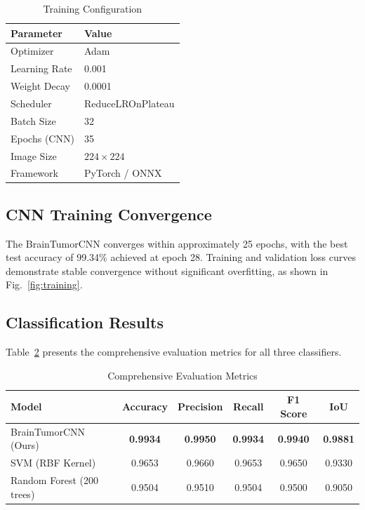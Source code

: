 \documentclass[conference]{IEEEtran}
\begin{document}
\begin{table}[h]
\centering
\caption{Training Configuration}
\label{tab:training}
\begin{tabular}{ll}
\toprule
\textbf{Parameter} & \textbf{Value} \\
\midrule
Optimizer & Adam \\
Learning Rate & 0.001 \\
Weight Decay & 0.0001 \\
Scheduler & ReduceLROnPlateau \\
Batch Size & 32 \\
Epochs (CNN) & 35 \\
Image Size & $224 \times 224$ \\
Framework & PyTorch / ONNX \\
\bottomrule
\end{tabular}
\end{table}

\subsection{CNN Training Convergence}
The BrainTumorCNN converges within approximately 25 epochs, with the best test accuracy of 99.34\% achieved at epoch 28. Training and validation loss curves demonstrate stable convergence without significant overfitting, as shown in Fig.~\ref{fig:training}.

\subsection{Classification Results}
Table~\ref{tab:results} presents the comprehensive evaluation metrics for all three classifiers.

\begin{table}[h]
\centering
\caption{Comprehensive Evaluation Metrics}
\label{tab:results}
\begin{tabular}{lccccc}
\toprule
\textbf{Model} & \textbf{Accuracy} & \textbf{Precision} & \textbf{Recall} & \textbf{F1 Score} & \textbf{IoU} \\
\midrule
BrainTumorCNN (Ours) & \textbf{0.9934} & \textbf{0.9950} & \textbf{0.9934} & \textbf{0.9940} & \textbf{0.9881} \\
SVM (RBF Kernel) & 0.9653 & 0.9660 & 0.9653 & 0.9650 & 0.9330 \\
Random Forest (200 trees) & 0.9504 & 0.9510 & 0.9504 & 0.9500 & 0.9050 \\
\bottomrule
\end{tabular}
\end{table}
\end{document}

